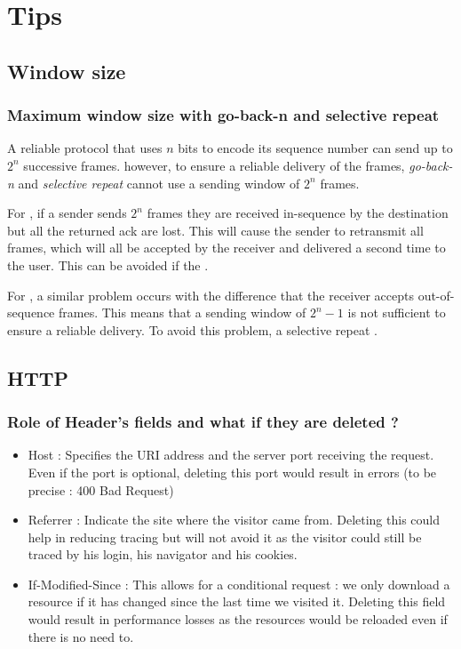 \chapter{Tips}

\section{Window size}

\subsection{Maximum window size with go-back-n and selective repeat}
A reliable protocol that uses $n$ bits to encode its sequence number can send up to $2^n$ successive frames. however, to ensure a reliable delivery of the frames, \textit{go-back-n} and \textit{selective repeat} cannot use a sending window of $2^n$ frames.

For , if a sender sends $2^n$ frames they are received in-sequence by the destination but all the returned ack are lost. This will cause the sender to retransmit all frames, which will all be accepted by the receiver and delivered a second time to the user. This can be avoided if the .

For , a similar problem occurs with the difference that the receiver accepts out-of-sequence frames. This means that a sending window of $2^n-1$ is not sufficient to ensure a reliable delivery. To avoid this problem, a selective repeat .

\section{HTTP}

\subsection{Role of Header's fields and what if they are deleted ?}
\begin{itemize}
\item Host : Specifies the URI address and the server port receiving the request. Even if the port is optional, deleting this port would result in errors (to be precise : 400 Bad Request)
\item Referrer : Indicate the site where the visitor came from. Deleting this could help in reducing tracing but will not avoid it as the visitor could still be traced by his login, his navigator and his cookies.
\item If-Modified-Since : This allows for a conditional request : we only download a resource if it has changed since the last time we visited it. Deleting this field would result in performance losses as the resources would be reloaded even if there is no need to.
\end{itemize}

